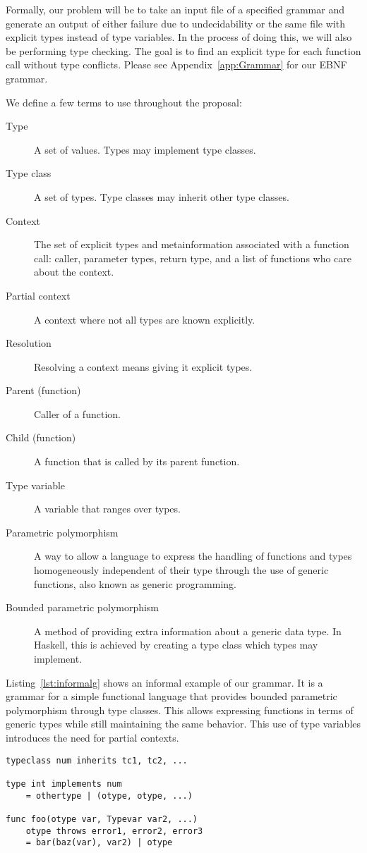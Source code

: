 \documentclass{acm_proc_article-sp}
\begin{document}
Formally, our problem will be to take an input file of a specified grammar and
generate an output of either failure due to undecidability or the same file
with explicit types instead of type variables. In the process of doing this, we
will also be performing type checking. The goal is to find an explicit type for
each function call without type conflicts. Please see Appendix~\ref{app:Grammar}
for our EBNF grammar.

We define a few terms to use throughout the proposal:
\begin{description}
	\item[Type] A set of values. Types may implement type classes.
	\item[Type class] A set of types. Type classes may inherit other type classes.
	\item[Context] The set of explicit types and metainformation associated
		with a function call: caller, parameter types, return type,
		and a list of functions who care about the context.
	\item[Partial context] A context where not all types are known explicitly.
	\item[Resolution] Resolving a context means giving it explicit types.
	\item[Parent (function)] Caller of a function.
	\item[Child (function)] A function that is called by its parent function.
	\item[Type variable] A variable that ranges over types.
	\item[Parametric polymorphism] A way to allow a language to express the
		handling of functions and types homogeneously independent of their type
		through the use of generic functions, also known as generic
		programming.
	\item[Bounded parametric polymorphism] A method of providing extra
		information about a generic data type. In Haskell, this is achieved by
		creating a type class which types may implement.
\end{description}

Listing~\ref{lst:informalg} shows an informal example of our grammar. It is a
grammar for a simple functional language that provides bounded parametric
polymorphism through type classes. This allows expressing functions in terms of
generic types while still maintaining the same behavior. This use of type
variables introduces the need for partial contexts.

\begin{lstlisting}[caption=Grammar displayed informally,language=Paratype,label=lst:informalg]
typeclass num inherits tc1, tc2, ...

type int implements num
    = othertype | (otype, otype, ...)

func foo(otype var, Typevar var2, ...)
    otype throws error1, error2, error3
    = bar(baz(var), var2) | otype
\end{lstlisting}
\end{document}
